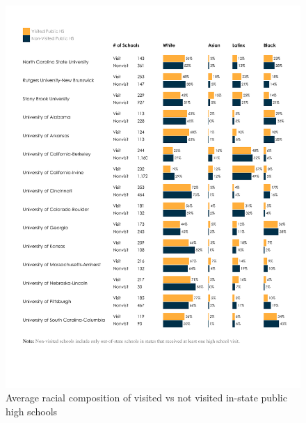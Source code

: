 \documentclass{article}
\begin{document}
\begin{figure}[!ht]
    \centering
    \includegraphics[width=\textwidth, trim={1.25cm, 4cm, 1cm, 1.5cm}, clip]{assets/graphs/race_graph_pub_in.pdf}
    \caption{Average racial composition of visited vs not visited in-state public high schools}
    \label{fig:race_graph_pub_in}
\end{figure}
\end{document}
